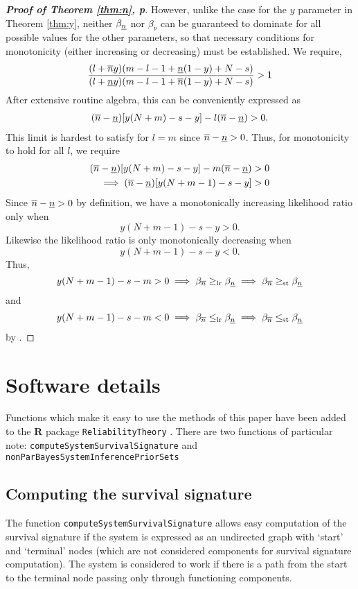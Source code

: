 \documentclass[12pt, a4paper]{elsarticle}
\begin{document}
\begin{proof}[\textbf{Proof of Theorem \ref{thm:n}, p\pageref{thm:n}}]
  However, unlike the case for the $y$ parameter in Theorem \ref{thm:y}, neither $\beta_{\underline{n}}$ 
  nor $\beta_{\nu}$ can be guaranteed to dominate for all possible values 
  for the other parameters, so that necessary conditions for
  monotonicity (either increasing or decreasing) must be established.
  We require,
  \[ \frac{(l + \overline{n} y) (m - l - 1 + \underline{n} (1 - y) + N - s)}
          {(l + \underline{n} y) (m - l - 1 + \overline{n} (1 - y) + N - s)}
     >1
  \]
  After extensive routine algebra, this can be conveniently expressed as
  \begin{align*}
    (\overline{n} - \underline{n})[y (N + m) - s - y] - l (\overline{n} - \underline{n})>0.
  \end{align*}
  This limit is hardest to satisfy for $l=m$ since $\overline{n}-\underline{n}>0$.
  Thus, for monotonicity to hold for all $l$, we require
  \begin{align*}
    (\overline{n} - \underline{n})[y (N + m) - s - y] - m (\overline{n} - \underline{n}) &>0 \\
    \implies (\overline{n} - \underline{n})[y (N + m - 1) - s - y] &>0
  \end{align*}
  Since $\overline{n}-\underline{n}>0$ by definition, we have a monotonically increasing 
  likelihood ratio only when \[ y (N + m - 1) - s - y > 0. \]  Likewise 
  the likelihood ratio is only monotonically decreasing when
  \[ y (N + m - 1) - s - y < 0. \]
  Thus,
  \[ y(N+m-1)-s-m > 0 \implies \beta_{\overline{n}} \ge_{\mathrm{lr}} \beta_{\underline{n}} \implies \beta_{\overline{n}} \ge_{\mathrm{st}} \beta_{\underline{n}} \]
  and 
  \[ y(N+m-1)-s-m < 0 \implies \beta_{\overline{n}} \le_{\mathrm{lr}} \beta_{\underline{n}} \implies \beta_{\overline{n}} \le_{\mathrm{st}} \beta_{\underline{n}} \]
  by \cite[Theorem 1.C.1, p.43]{shaked2007}.
\end{proof}



\section{Software details}
\label{ap:software}

Functions which make it easy to use the methods of this paper have been added to the \textbf{R} package \texttt{ReliabilityTheory} \citep{2015:aslett-RT}.  There are two functions of particular note: \texttt{computeSystemSurvivalSignature} and \texttt{nonParBayesSystemInferencePriorSets}

\subsection{Computing the survival signature}

The function \texttt{computeSystemSurvivalSignature} allows easy 
computation of the survival signature if the system is expressed as an
undirected graph with `start' and `terminal' nodes (which are not
considered components for survival signature computation).  The system
is considered to work if there is a path from the start to the terminal
node passing only through functioning components.
\end{document}
